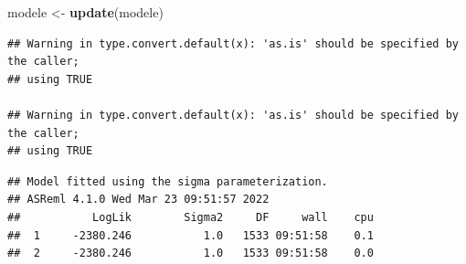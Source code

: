 \documentclass[
  12pt,
]{book}
\newenvironment{Shaded}{\begin{snugshade}}{\end{snugshade}}
\newcommand{\KeywordTok}[1]{\textcolor[rgb]{0.13,0.29,0.53}{\textbf{#1}}}
\newcommand{\NormalTok}[1]{#1}
\newcommand{\OperatorTok}[1]{\textcolor[rgb]{0.81,0.36,0.00}{\textbf{#1}}}
\newcommand{\StringTok}[1]{\textcolor[rgb]{0.31,0.60,0.02}{#1}}
\begin{document}
\begin{Shaded}
\begin{Highlighting}[]
\NormalTok{modele \textless{}{-}}\StringTok{ }\KeywordTok{update}\NormalTok{(modele)}
\end{Highlighting}
\end{Shaded}

\begin{verbatim}
## Warning in type.convert.default(x): 'as.is' should be specified by the caller;
## using TRUE

## Warning in type.convert.default(x): 'as.is' should be specified by the caller;
## using TRUE
\end{verbatim}

\begin{verbatim}
## Model fitted using the sigma parameterization.
## ASReml 4.1.0 Wed Mar 23 09:51:57 2022
##           LogLik        Sigma2     DF     wall    cpu
##  1     -2380.246           1.0   1533 09:51:58    0.1
##  2     -2380.246           1.0   1533 09:51:58    0.0
\end{verbatim}

\begin{Shaded}
\end{Shaded}
\end{document}

